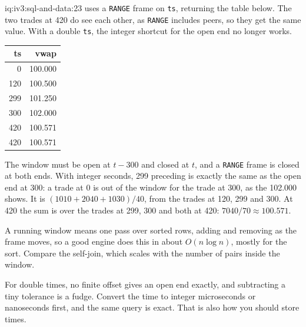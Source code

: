 \begin{solution}{iq:iv3:sql-and-data:23}
 uses a \texttt{RANGE} frame on \texttt{ts}, returning the table below. The two trades at 420 do see each other, as \texttt{RANGE} includes peers, so they get the same value. With a double \texttt{ts}, the integer shortcut for the open end no longer works.
\label{lst:iv3:sq:rvwap}
\begin{center}\small
\begin{tabular}{rr}
ts & vwap\\\hline
0 & 100.000\\
120 & 100.500\\
299 & 101.250\\
300 & 102.000\\
420 & 100.571\\
420 & 100.571
\end{tabular}
\end{center}
The window must be open at $t - 300$ and closed at $t$, and a \texttt{RANGE} frame is closed at both ends. With integer seconds, 299 preceding is exactly the same as the open end at 300: a trade at 0 is out of the window for the trade at 300, as the 102.000 shows. It is $(1010 + 2040 + 1030) / 40$, from the trades at 120, 299 and 300. At 420 the sum is over the trades at 299, 300 and both at 420: $7040 / 70 \approx 100.571$.

A running window means one pass over sorted rows, adding and removing as the frame moves, so a good engine does this in about $O(n \log n)$, mostly for the sort. Compare the self-join, which scales with the number of pairs inside the window.

For double times, no finite offset gives an open end exactly, and subtracting a tiny tolerance is a fudge. Convert the time to integer microseconds or nanoseconds first, and the same query is exact. That is also how you should store times.

\end{solution}

